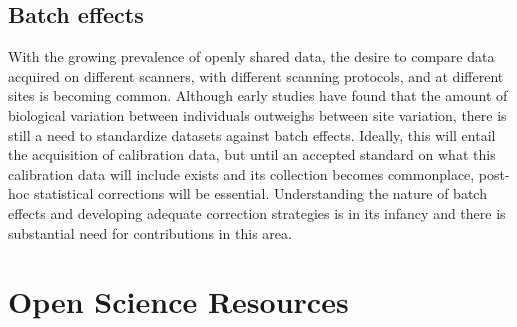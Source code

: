 \subsection{Batch effects}

With the growing prevalence of openly shared data, the desire to compare data acquired on different scanners, with different scanning protocols, and at different sites is becoming common. Although early studies have found that the amount of biological variation between individuals outweighs between site variation\cite{Biswal}, there is still a need to standardize datasets against batch effects\cite{YanStand}. Ideally, this will entail the acquisition of calibration data, but until an accepted standard on what this calibration data will include exists and its collection becomes commonplace, post-hoc statistical corrections will be essential. Understanding the nature of batch effects and developing adequate correction strategies is in its infancy and there is substantial need for contributions in this area.  

\section{Open Science Resources}

